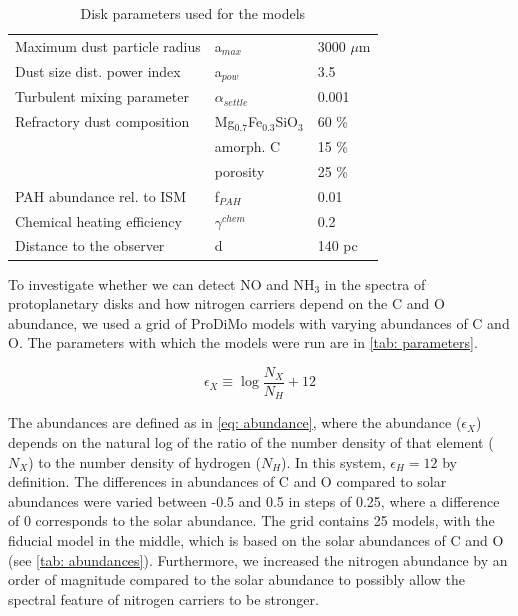\documentclass[twoside, single, authoryear, semicolon]{lion-msc}
\newcommand{\4}{$_4$}
\newcommand{\3}{$_3$}
\newcommand{\2}{$_2$}
\begin{document}
\begin{table}[!ht]
\begin{tabular}{@{}lll@{}}
Maximum dust particle radius      & a$_{max}$                   & 3000 $\mu$m                \\
Dust size dist. power index       & a$_{pow}$                   & 3.5                        \\
Turbulent mixing parameter        & $\alpha_{settle}$           & 0.001                      \\
Refractory dust composition       & Mg$_{0.7}$Fe$_{0.3}$SiO\3 & 60 \%                      \\
                                  & amorph. C                   & 15 \%                      \\
                                  & porosity                    & 25 \%                      \\
PAH abundance rel. to ISM         & f$_{PAH}$                   & 0.01                       \\
Chemical heating efficiency       & $\gamma^{chem}$             & 0.2                        \\ \midrule
Distance to the observer          & d                           & 140 pc                     \\ \bottomrule
\end{tabular}
\caption{Disk parameters used for the models}
\label{tab: parameters}
\end{table}

To investigate whether we can detect NO and NH\3 in the spectra of protoplanetary disks and how nitrogen carriers depend on the C and O abundance, we used a grid of ProDiMo models with varying abundances of C and O. The parameters with which the models were run are in \autoref{tab: parameters}.

\begin{equation}
    \epsilon_X\equiv\log\frac{N_X}{N_H}+12
\label{eq: abundance}
\end{equation}

The abundances are defined as in \autoref{eq: abundance}, where the abundance ($\epsilon_X$) depends on the natural log of the ratio of the number density of that element ($N_X$) to the number density of hydrogen ($N_H$). In this system, $\epsilon_H=12$ by definition. The differences in abundances of C and O compared to solar abundances were varied between -0.5 and 0.5 in steps of 0.25, where a difference of 0 corresponds to the solar abundance. The grid contains 25 models, with the fiducial model in the middle, which is based on the solar abundances of C and O (see \autoref{tab: abundances}). Furthermore, we increased the nitrogen abundance by an order of magnitude compared to the solar abundance to possibly allow the spectral feature of nitrogen carriers to be stronger.
\end{document}
